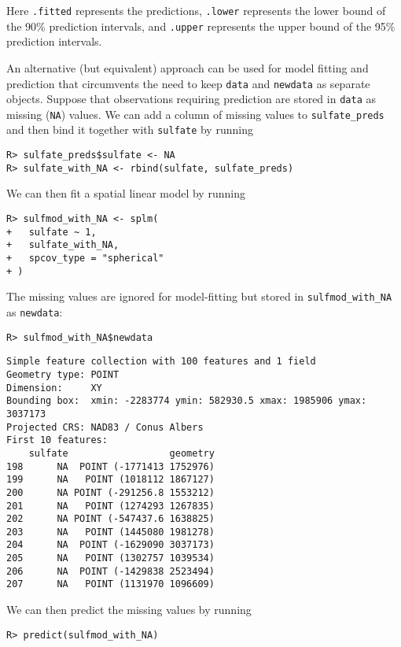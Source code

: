 \documentclass[10pt,letterpaper]{article}
\begin{document}
Here \texttt{.fitted} represents the predictions, \texttt{.lower}
represents the lower bound of the 90\% prediction intervals, and
\texttt{.upper} represents the upper bound of the 95\% prediction
intervals.

An alternative (but equivalent) approach can be used for model fitting
and prediction that circumvents the need to keep \texttt{data} and
\texttt{newdata} as separate objects. Suppose that observations
requiring prediction are stored in \texttt{data} as missing
(\texttt{NA}) values. We can add a column of missing values to
\texttt{sulfate\_preds} and then bind it together with \texttt{sulfate}
by running

\begin{verbatim}
R> sulfate_preds$sulfate <- NA
R> sulfate_with_NA <- rbind(sulfate, sulfate_preds)
\end{verbatim}

We can then fit a spatial linear model by running

\begin{verbatim}
R> sulfmod_with_NA <- splm(
+   sulfate ~ 1,
+   sulfate_with_NA,
+   spcov_type = "spherical"
+ )
\end{verbatim}

The missing values are ignored for model-fitting but stored in
\texttt{sulfmod\_with\_NA} as \texttt{newdata}:

\begin{verbatim}
R> sulfmod_with_NA$newdata
\end{verbatim}

\begin{verbatim}
Simple feature collection with 100 features and 1 field
Geometry type: POINT
Dimension:     XY
Bounding box:  xmin: -2283774 ymin: 582930.5 xmax: 1985906 ymax: 3037173
Projected CRS: NAD83 / Conus Albers
First 10 features:
    sulfate                  geometry
198      NA  POINT (-1771413 1752976)
199      NA   POINT (1018112 1867127)
200      NA POINT (-291256.8 1553212)
201      NA   POINT (1274293 1267835)
202      NA POINT (-547437.6 1638825)
203      NA   POINT (1445080 1981278)
204      NA  POINT (-1629090 3037173)
205      NA   POINT (1302757 1039534)
206      NA  POINT (-1429838 2523494)
207      NA   POINT (1131970 1096609)
\end{verbatim}

We can then predict the missing values by running

\begin{verbatim}
R> predict(sulfmod_with_NA)
\end{verbatim}
\end{document}
